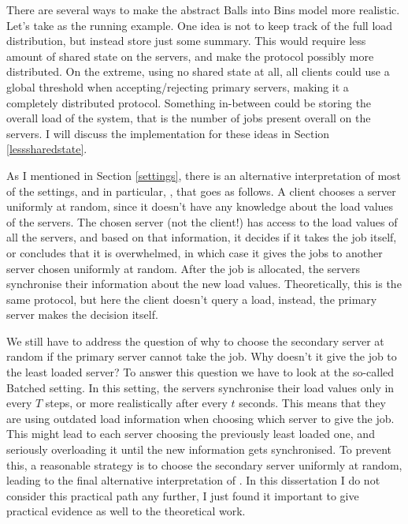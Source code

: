 There are several ways to make the abstract Balls into Bins model more realistic. Let's take \TwoThinning as the running example. One idea is not to keep track of the full load distribution, but instead store just some summary. This would require less amount of shared state on the servers, and make the protocol possibly more distributed. On the extreme, using no shared state at all, all clients could use a global threshold when accepting/rejecting primary servers, making it a completely distributed protocol. Something in-between could be storing the overall load of the system, that is the number of jobs present overall on the servers. I will discuss the implementation for these ideas in Section \ref{lesssharedstate}.


As I mentioned in Section \ref{settings}, there is an alternative interpretation of most of the settings, and in particular, \TwoThinning, that goes as follows. A client chooses a server uniformly at random, since it doesn't have any knowledge about the load values of the servers. The chosen server (not the client!) has access to the load values of all the servers, and based on that information, it decides if it takes the job itself, or concludes that it is overwhelmed, in which case it gives the jobs to another server chosen uniformly at random. After the job is allocated, the servers synchronise their information about the new load values. Theoretically, this is the same \TwoThinning protocol, but here the client doesn't query a load, instead, the primary server makes the decision itself.


We still have to address the question of why to choose the secondary server at random if the primary server cannot take the job. Why doesn't it give the job to the least loaded server? To answer this question we have to look at the so-called Batched setting. In this setting, the servers synchronise their load values only in every $T$ steps, or more realistically after every $t$ seconds. This means that they are using outdated load information when choosing which server to give the job. This might lead to each server choosing the previously least loaded one, and seriously overloading it until the new information gets synchronised. To prevent this, a reasonable strategy is to choose the secondary server uniformly at random, leading to the final alternative interpretation of \TwoThinning. In this dissertation I do not consider this practical path any further, I just found it important to give practical evidence as well to the theoretical work.


